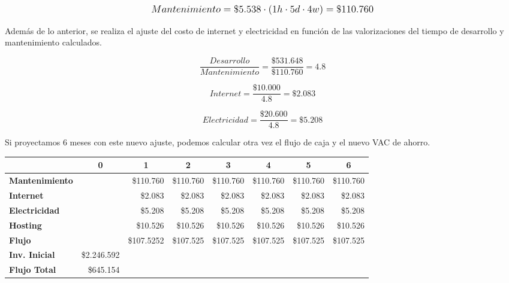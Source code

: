\[
\mathlarger{
	Mantenimiento = \$5.538 \cdot \left(1h\cdot5d\cdot4w\right) = \$110.760
}
\]

Además de lo anterior, se realiza el ajuste del costo de internet y electricidad en función de las valorizaciones del tiempo de desarrollo y mantenimiento calculados.

\[
\frac{Desarrollo}{Mantenimiento} = \frac{\$531.648}{\$110.760} = 4.8
\]

\[
Internet = \frac{\$10.000}{4.8} = \$2.083
\]

\[
Electricidad = \frac{\$20.600}{4.8} = \$5.208
\]

Si proyectamos 6 meses con este nuevo ajuste, podemos calcular otra vez el flujo de caja y el nuevo VAC de ahorro.

\begin{center}
	\begin{tabular}{ | l | l | l | l | l | l | l | l |}
		\hline
		& \multicolumn{1}{|c|}{\textbf{0}} & \multicolumn{1}{|c|}{\textbf{1}} & \multicolumn{1}{|c|}{\textbf{2}} & \multicolumn{1}{|c|}{\textbf{3}} & \multicolumn{1}{|c|}{\textbf{4}} & \multicolumn{1}{|c|}{\textbf{5}} & \multicolumn{1}{|c|}{\textbf{6}} \\
		\hline
		{\textbf{Mantenimiento}} &  & \multicolumn{1}{|r|}{\$110.760} & \multicolumn{1}{|r|}{\$110.760} & \multicolumn{1}{|r|}{\$110.760} & \multicolumn{1}{|r|}{\$110.760} & \multicolumn{1}{|r|}{\$110.760} & \multicolumn{1}{|r|}{\$110.760} \\ \hline
		
		{\textbf{Internet}} &  & \multicolumn{1}{|r|}{\$2.083} & \multicolumn{1}{|r|}{\$2.083} & \multicolumn{1}{|r|}{\$2.083} & \multicolumn{1}{|r|}{\$2.083} & \multicolumn{1}{|r|}{\$2.083} & \multicolumn{1}{|r|}{\$2.083} \\ \hline
		
		{\textbf{Electricidad}} &  & \multicolumn{1}{|r|}{\$5.208} & \multicolumn{1}{|r|}{\$5.208} & \multicolumn{1}{|r|}{\$5.208} & \multicolumn{1}{|r|}{\$5.208} & \multicolumn{1}{|r|}{\$5.208} & \multicolumn{1}{|r|}{\$5.208} \\ \hline
		
		{\textbf{Hosting}} &  & \multicolumn{1}{|r|}{\$10.526} & \multicolumn{1}{|r|}{\$10.526} & \multicolumn{1}{|r|}{\$10.526} & \multicolumn{1}{|r|}{\$10.526} & \multicolumn{1}{|r|}{\$10.526} & \multicolumn{1}{|r|}{\$10.526} \\ \hline
		
		{\textbf{Flujo}} &  & \multicolumn{1}{|r|}{\$107.5252} & \multicolumn{1}{|r|}{\$107.525} & \multicolumn{1}{|r|}{\$107.525} & \multicolumn{1}{|r|}{\$107.525} & \multicolumn{1}{|r|}{\$107.525} & \multicolumn{1}{|r|}{\$107.525} \\ \hline
		{\textbf{Inv. Inicial}} & \multicolumn{1}{|r|}{\$2.246.592} & & & & & & \\ \hline
		\textbf{Flujo Total} & \multicolumn{1}{|r|}{\$645.154} & & & & & & \\ \hline
	\end{tabular}
\end{center}

